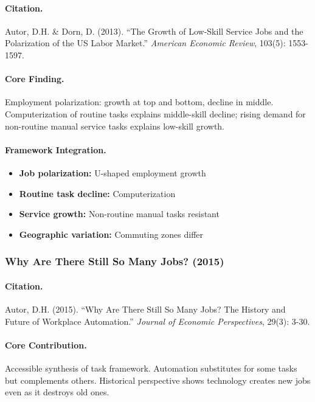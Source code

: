 \paragraph{Citation.}
Autor, D.H. \& Dorn, D. (2013). ``The Growth of Low-Skill Service Jobs
and the Polarization of the US Labor Market.''
\emph{American Economic Review}, 103(5): 1553-1597.

\paragraph{Core Finding.}
Employment polarization: growth at top and bottom, decline in middle.
Computerization of routine tasks explains middle-skill decline; rising
demand for non-routine manual service tasks explains low-skill growth.

\paragraph{Framework Integration.}
\begin{itemize}
  \item \textbf{Job polarization:} U-shaped employment growth
  \item \textbf{Routine task decline:} Computerization
  \item \textbf{Service growth:} Non-routine manual tasks resistant
  \item \textbf{Geographic variation:} Commuting zones differ
\end{itemize}

\subsubsection{Why Are There Still So Many Jobs? (2015)}

\paragraph{Citation.}
Autor, D.H. (2015). ``Why Are There Still So Many Jobs? The History and
Future of Workplace Automation.''
\emph{Journal of Economic Perspectives}, 29(3): 3-30.

\paragraph{Core Contribution.}
Accessible synthesis of task framework. Automation substitutes for some
tasks but complements others. Historical perspective shows technology
creates new jobs even as it destroys old ones.

